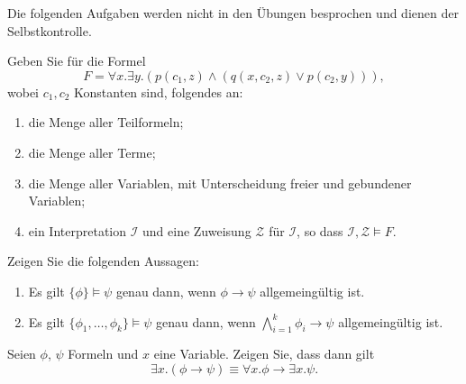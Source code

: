 \documentclass[german]{latteachCD}[2017/03/28]
\begin{document}
\maketitle

\begin{mdframed}
  Die folgenden Aufgaben werden nicht in den Übungen besprochen und dienen der
  Selbstkontrolle.

  \renewcommand{\theexercise}{\Roman{exercise}}
  \setcounter{exercise}{0}

  \begin{exercise}
    Geben Sie für die Formel
    \begin{equation*}
      F = \forall x. \exists y. (p(c_{1},z) \land (q(x,c_{2},z) \lor p(c_{2},y))),
    \end{equation*}
    wobei $c_{1}, c_{2}$ Konstanten sind, folgendes an:
    \begin{enumerate}
    \item die Menge aller Teilformeln;
    \item die Menge aller Terme;
    \item die Menge aller Variablen, mit Unterscheidung freier und gebundener
      Variablen;
    \item ein Interpretation $\mathcal{I}$ und eine Zuweisung $\mathcal{Z}$ für
      $\mathcal{I}$, so dass $\mathcal{I}, \mathcal{Z} \models F$.
    \end{enumerate}
  \end{exercise}

  \begin{exercise}
    Zeigen Sie die folgenden Aussagen:
    \begin{enumerate}
    \item Es gilt $\{\phi\} \models \psi$ genau dann, wenn $\phi \to \psi$
      allgemeingültig ist.
    \item Es gilt $\{\phi_{1}, \dots, \phi_{k}\} \models \psi$ genau dann, wenn
      $\bigwedge_{i=1}^{k} \phi_{i} \to \psi$ allgemeingültig ist.
    \end{enumerate}
  \end{exercise}

  \begin{exercise}
    Seien $\phi$, $\psi$ Formeln und $x$ eine Variable.  Zeigen Sie, dass dann gilt
    \begin{equation*}
      \exists x.(\phi \to \psi) \equiv \forall x. \phi \to \exists x. \psi.
    \end{equation*}
  \end{exercise}
  \vspace*{-1.5\baselineskip}
\end{mdframed}
\end{document}
